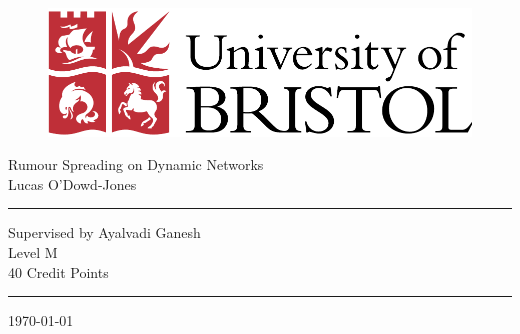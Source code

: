\begin{titlepage}
\thispagestyle{empty}

\begin{figure}[h]
\begin{center}
\includegraphics[scale=0.5]{graphics/uob_logo.pdf} %
\end{center}
\end{figure}

\begin{center}
{\Large Rumour Spreading on Dynamic Networks\\ \vspace{1cm}Lucas O'Dowd-Jones}
\end{center}

\vspace{3cm}
\hrule
\begin{center}
Supervised by Ayalvadi Ganesh\\
Level M\\
40 Credit Points
\end{center}
\hrule

\vspace{3cm}
\begin{center}
\today
\end{center}

\end{titlepage}
